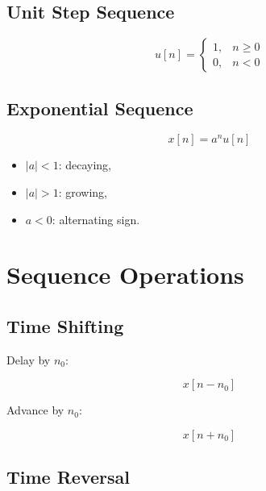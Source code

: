 
\subsection{Unit Step Sequence}

\[
\boxed{
u[n]=
\begin{cases}
1, & n\ge0\\
0, & n<0
\end{cases}
}
\]


\subsection{Exponential Sequence}

\[
\boxed{
x[n]=a^n u[n]
}
\]

\begin{itemize}
\item \(|a|<1\): decaying,
\item \(|a|>1\): growing,
\item \(a<0\): alternating sign.
\end{itemize}


\section{Sequence Operations}


\subsection{Time Shifting}

Delay by \(n_0\):

\[
\boxed{
x[n-n_0]
}
\]

Advance by \(n_0\):

\[
\boxed{
x[n+n_0]
}
\]


\subsection{Time Reversal}

